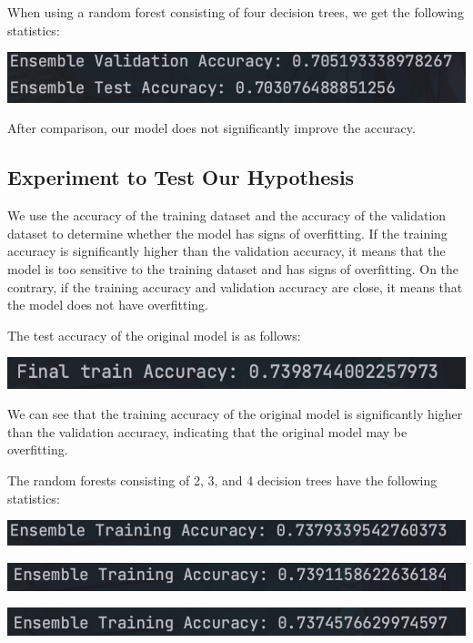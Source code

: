 \documentclass{article}
\begin{document}
When using a random forest consisting of four decision trees, we get the following statistics:

\includegraphics[width=0.7\linewidth]{6121723196137_.pic.jpg}
    
After comparison, our model does not significantly improve the accuracy.

\subsection*{Experiment to Test Our Hypothesis}

We use the accuracy of the training dataset and the accuracy of the validation dataset to determine whether the model has signs of overfitting. If the training accuracy is significantly higher than the validation accuracy, it means that the model is too sensitive to the training dataset and has signs of overfitting. On the contrary, if the training accuracy and validation accuracy are close, it means that the model does not have overfitting.

The test accuracy of the original model is as follows:

\includegraphics[width=0.7\linewidth]{6071723195572_.pic.jpg}

We can see that the training accuracy of the original model is significantly higher than the validation accuracy, indicating that the original model may be overfitting.

The random forests consisting of 2, 3, and 4 decision trees have the following statistics:

\includegraphics[width=0.7\linewidth]{6091723195756_.pic.jpg}

\includegraphics[width=0.7\linewidth]{6111723195885_.pic.jpg}

\includegraphics[width=0.7\linewidth]{6131723196143_.pic.jpg}
\end{document}
